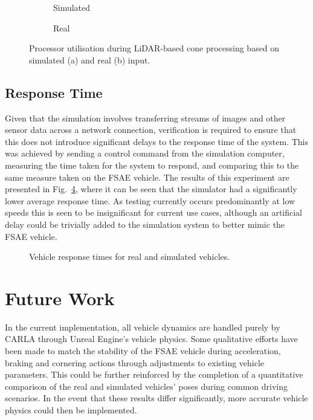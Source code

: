 \begin{figure}[H]
	\centering
	\begin{subfigure}[b]{0.7\textwidth}
		
		\caption{Simulated}  
		\label{fig:8:computeHardwareLoad:Sim}
	\end{subfigure} 
	\vspace{1em}         
	\begin{subfigure}[b]{0.7\textwidth}
		
		\caption{Real}
		\label{fig:8:computeHardwareLoad:Real}
	\end{subfigure}
	\caption[Processor utilisation during LiDAR-based cone processing]{Processor utilisation during LiDAR-based cone processing based on simulated (a) and real (b) input.}
	\label{fig:8:computeHardwareLoad}
\end{figure}

\subsection{Response Time} \label{subsec:8:responseTime}
Given that the simulation involves transferring streams of images and other sensor data across a network connection, verification is required to ensure that this does not introduce significant delays to the response time of the system.
This was achieved by sending a control command from the simulation computer, measuring the time taken for the system to respond, and comparing this to the same measure taken on the FSAE vehicle.
The results of this experiment are presented in Fig.~\ref{fig:8:responseTimes}, where it can be seen that the simulator had a significantly lower average response time.
As testing currently occurs predominantly at low speeds this is seen to be insignificant for current use cases, although an artificial delay could be trivially added to the simulation system to better mimic the FSAE vehicle.

\begin{figure}[H] %
	\centering
	
	\caption{Vehicle response times for real and simulated vehicles.}
	\label{fig:8:responseTimes}
\end{figure}

\section{Future Work} \label{sec:8:futureWork}
In the current implementation, all vehicle dynamics are handled purely by CARLA through Unreal Engine's vehicle physics.
Some qualitative efforts have been made to match the stability of the FSAE vehicle during acceleration, braking and cornering actions through adjustments to existing vehicle parameters.
This could be further reinforced by the completion of a quantitative comparison of the real and simulated vehicles' poses during common driving scenarios.
In the event that these results differ significantly, more accurate vehicle physics could then be implemented.

